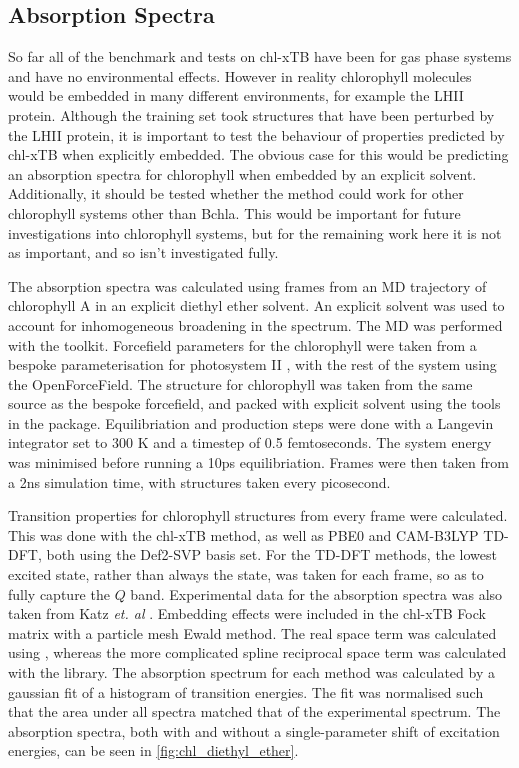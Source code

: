 \afterpartskip
\subsection{Absorption Spectra}
\label{subsec:absorption_spectra}

So far all of the benchmark and tests on chl-xTB have been for gas phase systems
and have no environmental effects. However in reality chlorophyll molecules would
be embedded in many different environments, for example the LHII protein. Although
the training set took structures that have been perturbed by the LHII protein, it
is important to test the behaviour of properties predicted by chl-xTB when explicitly
embedded. The obvious case for this would be predicting an absorption spectra for
chlorophyll when embedded by an explicit solvent. Additionally, it should be tested
whether the method could work for other chlorophyll systems other than Bchla. This
would be important for future investigations into chlorophyll systems, but for the
remaining work here it is not as important, and so isn't investigated fully.

The absorption spectra was calculated using frames from an MD trajectory of chlorophyll
A in an explicit diethyl ether solvent. An explicit solvent was used to account
for inhomogeneous broadening in the spectrum. The MD was performed with the
 toolkit. Forcefield parameters for the chlorophyll were taken from
a bespoke parameterisation for photosystem II \cite{Zhang2012}, with the rest of
the system using the OpenForceField. The structure for chlorophyll was taken from
the same source as the bespoke forcefield, and packed with explicit solvent using
the tools in the  package. Equilibriation and production steps were 
done with a Langevin integrator set to 300 K  and a timestep of 0.5 femtoseconds.
The system energy was minimised before running a 10ps equilibriation. Frames were
then taken from a 2ns simulation time, with structures taken every picosecond.

Transition properties for chlorophyll structures from every frame were calculated.
This was done with the chl-xTB method, as well as PBE0 and CAM-B3LYP TD-DFT, both
using the Def2-SVP basis set. For the TD-DFT methods, the lowest excited state, 
rather than always the \Qy state, was taken for each frame, so as to fully capture 
the $Q$ band. Experimental data for the absorption spectra was also taken from Katz 
\emph{et. al} \cite{Strain1963}. Embedding effects were included in the chl-xTB
Fock matrix with a particle mesh Ewald method. The real space term was calculated
using , whereas the more complicated spline reciprocal space term was
calculated with the  library. The absorption spectrum for each method
was calculated by a gaussian fit of a histogram of transition  energies. The fit
was normalised such that the area under all spectra matched that of the experimental 
spectrum. The absorption spectra, both with and without a single-parameter shift
of excitation energies, can be seen in \ref{fig:chl_diethyl_ether}.


